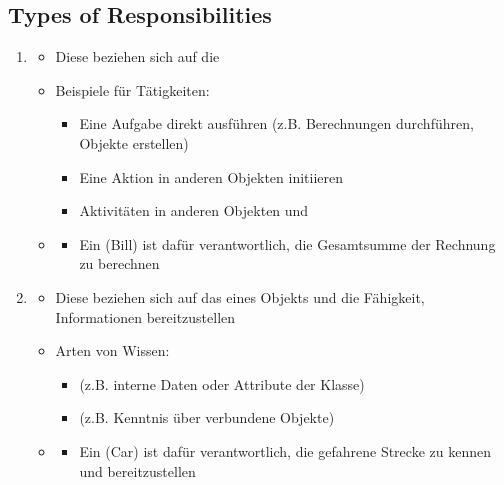 \subsection{Types of Responsibilities}
\begin{infoBox}[title=Grundtypen von Verantwortlichkeiten]
    \begin{enumerate}
        \item {}
        \begin{itemize}
            \item Diese beziehen sich auf die 
            \item Beispiele für Tätigkeiten:
            \begin{itemize}
                \item Eine Aufgabe direkt ausführen (z.B. Berechnungen durchführen, Objekte erstellen)
                \item Eine Aktion in anderen Objekten initiieren
                \item Aktivitäten in anderen Objekten  und 
            \end{itemize}
            \item {}
            \begin{itemize}
                \item Ein  (Bill) ist dafür verantwortlich, die Gesamtsumme der Rechnung zu berechnen
            \end{itemize}
        \end{itemize}
        \item {}
        \begin{itemize}
            \item Diese beziehen sich auf das  eines Objekts und die Fähigkeit, Informationen bereitzustellen
            \item Arten von Wissen:
            \begin{itemize}
                \item {} (z.B. interne Daten oder Attribute der Klasse)
                \item {} (z.B. Kenntnis über verbundene Objekte)
            \end{itemize}
            \item {}
            \begin{itemize}
                \item Ein  (Car) ist dafür verantwortlich, die gefahrene Strecke zu kennen und bereitzustellen
            \end{itemize}
        \end{itemize}
    \end{enumerate}
\end{infoBox}
